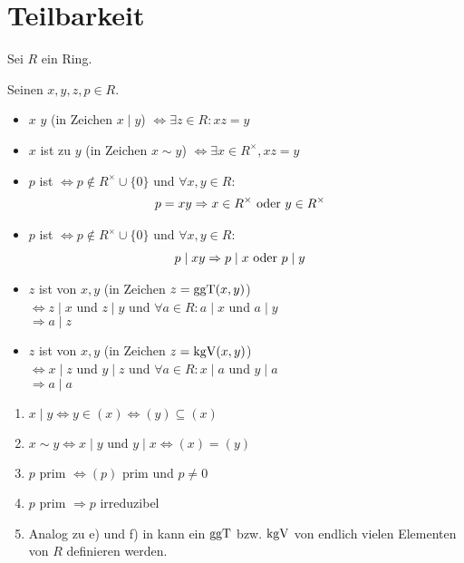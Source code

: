 \section{Teilbarkeit}

Sei $R$ ein  Ring.

\begin{definition}
	Seinen $x,y,z,p \in R$.
	\begin{itemize}
		\item $x$  $y$ (in Zeichen $x \mid y$) $\Leftrightarrow \exists z \in R: xz = y$
		\item $x$ ist  zu $y$ (in Zeichen $x \sim y$) $\Leftrightarrow \exists x \in R^{\times}, xz = y$
		\item $p$ ist  $\Leftrightarrow p \not \in R^{\times} \cup \{  0\}$ und $\forall x,y \in R$:
		\begin{align}
			p = xy &\Rightarrow x \in R^{\times} \text{ oder } y \in R^{\times} \notag
		\end{align}
		\item $p$ ist  $\Leftrightarrow  p \not \in R^{\times} \cup \{ 0 \}$ und $\forall x,y \in R$:
		\begin{align}
			p \mid xy &\Rightarrow p \mid x \text{ oder } p \mid y \notag
		\end{align}
		\item $z$ ist  von $x,y$ (in Zeichen $z = \operatorname{ggT}(x,y)$) \\
		$\Leftrightarrow  z \mid x$ und $z \mid y$ und $\forall a \in R: a\mid x$ und $a \mid y$\\
		$\Rightarrow a \mid z$
		\item $z$ ist  von $x,y$ (in Zeichen $z = \operatorname{kgV}(x,y)$)\\
		$\Leftrightarrow x \mid z$ und $y \mid z$ und $\forall a \in R: x \mid a$ und $y \mid a$\\
		$\Rightarrow a \mid a$ 
	\end{itemize}
\end{definition}

\begin{remark}
	\begin{enumerate}
		\item $x \mid y \Leftrightarrow y \in (x) \Leftrightarrow (y) \subseteq (x)$
		\item $x \sim y \Leftrightarrow x \mid y \text{ und } y \mid x \Leftrightarrow (x) = (y)$
		\item $p$ prim $\Leftrightarrow (p)$ prim und $p \neq 0$
		\item $p$ prim $\Rightarrow p$ irreduzibel
		\item Analog zu e) und f) in  kann ein $\operatorname{ggT}$ bzw. $\operatorname{kgV}$ von endlich vielen Elementen von $R$ definieren werden.
	\end{enumerate}
\end{remark}

